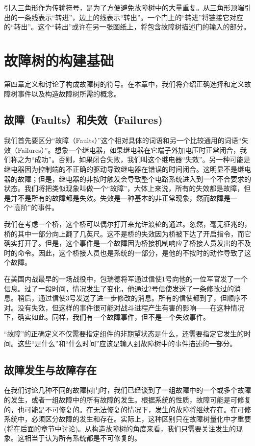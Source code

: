 \documentclass[cn,11pt,chinese]{elegantbook}
\begin{document}
引入三角形作为传输符号，是为了方便避免故障树中的大量重复。从三角形顶端引出的一条线表示“转进”，边上的线表示“转出”。一个门上的“转进”将链接它对应的“转出”。这个“转出”或许在另一张图纸上，将包含故障树描述门的输入的部分。


\chapter{故障树的构建基础}

第四章定义和讨论了构成故障树的符号。在本章中，我们将介绍正确选择和定义故障树事件以及构造故障树所需的概念。

\section{故障（Faults）和失效（Failures)}

我们首先要区分“故障（Faults）”这个相对具体的词语和另一个比较通用的词语“失效（Failures）”。想象一个继电器，如果继电器在它端子外加电压时正常闭合，我们称之为“成功”。否则，如果闭合失败，我们叫这个继电器“失效”。另一种可能是继电器因为控制端的不正确的驱动导致继电器在错误的时间闭合。这明显不是继电器的故障；但是，继电器的非按时触发会导致整个电路系统进入到一个不合要求的状态。我们将把类似现象叫做一个“故障”，大体上来说，所有的失效都是故障，但是并不是所有的故障都是失效。失效是一种基本的非正常现象，然而故障是一个“高阶”的事件。

我们在考虑一个桥，这个桥可以偶尔打开来允许渡轮的通过。忽然，毫无征兆的，桥的其中一部分向上翻了几英尺。这不是桥的失效因为桥被下达了开启指令，而它确实打开了。但是，这个事件是一个故障因为桥接机制响应了桥接人员发出的不及时的命令。因此，这个桥接人员也是系统的一部分，是他的不按时的动作导致了这个故障。

在美国内战最早的一场战役中，包瑞德将军通过信使1号向他的一位军官发了一个信息。过了一段时间，情况发生了变化，他通过2号信使发送了一条修改过的消息。稍后，通过信使3号发送了进一步修改的消息。所有的信使都到了，但顺序不对。没有失效，但这样的事件很可能对战斗进程产生有害的影响——在这种情况下，确实如此。同样，我们有一个故障事件，但不是一个失效事件。

“故障”的正确定义不仅需要指定组件的非期望状态是什么，还需要指定它发生的时间。这些“是什么”和“什么时间”应该是输入到故障树中的事件描述的一部分。

\section{故障发生与故障存在}

在我们讨论几种不同的故障树门时，我们已经谈到了一组故障中的一个或多个故障的发生，或者一组故障中的所有故障的发生。根据系统的性质，故障可能是可修复的，也可能是不可修复的。在无法修复的情况下，发生的故障将继续存在。在可修系统中，必须区分故障的发生和存在。实际上，这种区别只在故障树量化中才重要(将在后面的章节中讨论)。从构造故障树的角度来看，我们只需要关注发生的现象。这相当于认为所有系统都是不可修复的。
\end{document}
